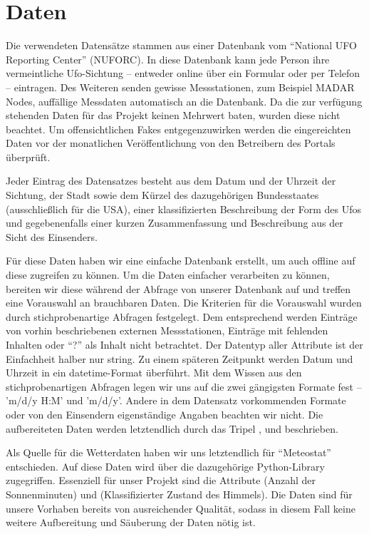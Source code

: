 \section{Daten} \label{data}

Die verwendeten Datensätze stammen aus einer Datenbank vom \enquote{National UFO Reporting Center} (NUFORC). In diese Datenbank kann jede Person ihre vermeintliche Ufo-Sichtung -- entweder online über ein Formular oder per Telefon -- eintragen. Des Weiteren senden gewisse Messstationen, zum Beispiel MADAR Nodes, auffällige Messdaten automatisch an die Datenbank\cite{madar:2020}. Da die zur verfügung stehenden Daten für das Projekt keinen Mehrwert baten, wurden diese nicht beachtet. Um offensichtlichen Fakes entgegenzuwirken werden die eingereichten Daten vor der monatlichen Veröffentlichung von den Betreibern des Portals überprüft.

Jeder Eintrag des Datensatzes besteht aus dem Datum und der Uhrzeit der Sichtung, der Stadt sowie dem Kürzel des dazugehörigen Bundesstaates (ausschließlich für die USA), einer klassifizierten Beschreibung der Form des Ufos und gegebenenfalls einer kurzen Zusammenfassung und Beschreibung aus der Sicht des Einsenders.

Für diese Daten haben wir eine einfache Datenbank erstellt, um auch offline auf diese zugreifen zu können. Um die Daten einfacher verarbeiten zu können, bereiten wir diese während der Abfrage von unserer Datenbank auf und treffen eine Vorauswahl an brauchbaren Daten. Die Kriterien für die Vorauswahl wurden durch stichprobenartige Abfragen festgelegt. Dem entsprechend werden Einträge von vorhin beschriebenen externen Messstationen, Einträge mit fehlenden Inhalten oder \enquote{?} als Inhalt nicht betrachtet. Der Datentyp aller Attribute ist der Einfachheit halber nur string. Zu einem späteren Zeitpunkt werden Datum und Uhrzeit in ein datetime-Format überführt. Mit dem Wissen aus den stichprobenartigen Abfragen legen wir uns auf die zwei gängigsten Formate fest -- 'm/d/y H:M' und 'm/d/y'. Andere in dem Datensatz vorkommenden Formate oder von den Einsendern eigenständige Angaben beachten wir nicht. Die aufbereiteten Daten werden letztendlich durch das Tripel ,  und  beschrieben.

Als Quelle für die Wetterdaten haben wir uns letztendlich für \enquote{Meteostat} entschieden\cite{meteostat:2021}. Auf diese Daten wird über die dazugehörige Python-Library zugegriffen. Essenziell für unser Projekt sind die Attribute  (Anzahl der Sonnenminuten) und  (Klassifizierter Zustand des Himmels). Die Daten sind für unsere Vorhaben bereits von ausreichender Qualität, sodass in diesem Fall keine weitere Aufbereitung und Säuberung der Daten nötig ist.

